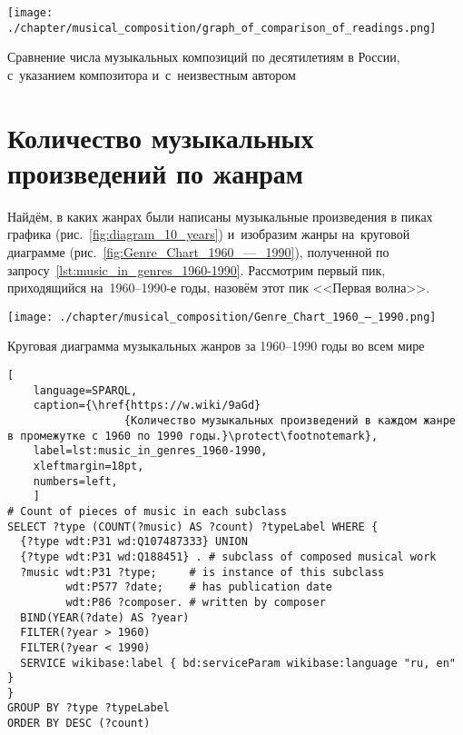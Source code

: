 


\begin{marginfigure}[0\baselineskip]
	\texttt{[image: ./chapter/musical\_composition/graph\_of\_comparison\_of\_readings.png]}
	\caption{Сравнение числа музыкальных композиций по десятилетиям в России,  
             с~указанием композитора и~с~неизвестным автором}%
	\label{fig:CompareRuMusComposerWithout}%
\end{marginfigure}





\newpage
\section{Количество музыкальных произведений по жанрам}
\label{chapter:Number-of-musical-works-by-genre}

Найдём, в каких жанрах были написаны музыкальные произведения 
в пиках графика (рис.~\ref{fig:diagram_10_years}) 
и~изобразим жанры на~круговой диаграмме (рис.~\ref{fig:Genre_Chart_1960_—_1990}), 
полученной по запросу~\ref{lst:music_in_genres_1960-1990}. 
Рассмотрим первый пик, приходящийся на~1960--1990-е годы, назовём этот пик <<Первая волна>>.

\begin{marginfigure}[0\baselineskip]
	\texttt{[image: ./chapter/musical\_composition/Genre\_Chart\_1960\_—\_1990.png]}
	\caption{Круговая диаграмма музыкальных жанров за 1960--1990 годы во всем мире}%
	\label{fig:Genre_Chart_1960_—_1990}%
\end{marginfigure}

\begin{lstlisting}[ 
    language=SPARQL,
    caption={\href{https://w.wiki/9aGd}
                  {Количество музыкальных произведений в каждом жанре в промежутке с 1960 по 1990 годы.}\protect\footnotemark},
    label=lst:music_in_genres_1960-1990,
    xleftmargin=18pt,
    numbers=left,
    ]
# Count of pieces of music in each subclass
SELECT ?type (COUNT(?music) AS ?count) ?typeLabel WHERE {
  {?type wdt:P31 wd:Q107487333} UNION 
  {?type wdt:P31 wd:Q188451} . # subclass of composed musical work
  ?music wdt:P31 ?type;     # is instance of this subclass
         wdt:P577 ?date;    # has publication date
         wdt:P86 ?composer. # written by composer
  BIND(YEAR(?date) AS ?year)
  FILTER(?year > 1960)        
  FILTER(?year < 1990)
  SERVICE wikibase:label { bd:serviceParam wikibase:language "ru, en" }
}
GROUP BY ?type ?typeLabel
ORDER BY DESC (?count)
\end{lstlisting}%

